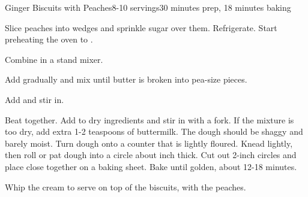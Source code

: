 \documentclass[../Cookbook.tex]{subfiles}
\begin{document}
\begin{recipe}{Ginger Biscuits with Peaches}{8-10 servings}{30 minutes prep, 18 minutes baking}

Slice peaches into wedges and sprinkle sugar over them. Refrigerate.
Start preheating the oven to .

Combine in a stand mixer.

Add gradually and mix until butter is broken into pea-size pieces.

Add and stir in.

Beat together. Add to dry ingredients and stir in with a fork. If the mixture is too dry, add extra 1-2 teaspoons of buttermilk. The dough should be shaggy and barely moist.
Turn dough onto a counter that is lightly floured. Knead lightly, then roll or pat dough into a circle about  inch thick. Cut out 2-inch circles and place close together on a baking sheet. Bake until golden, about 12-18 minutes.

Whip the cream to serve on top of the biscuits, with the peaches.

\end{recipe}
\end{document}
